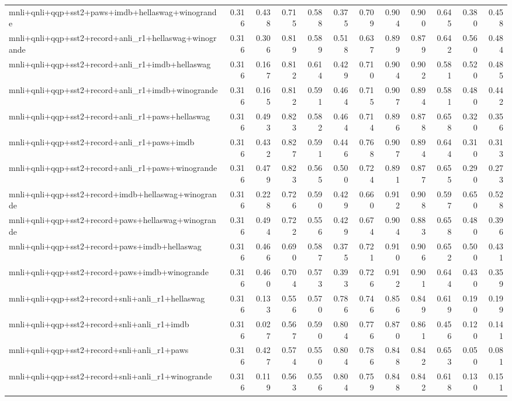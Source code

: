 \begin{table}[t]
\begin{tabular}{lrrrrrrrrrrr}
    mnli+qnli+qqp+sst2+paws+imdb+hellaswag+winogrande & 0.316 & 0.438 & 0.715 & 0.588 & 0.375 & 0.709 & 0.904 & 0.900 & 0.645 & 0.380 & 0.458 \\
    mnli+qnli+qqp+sst2+record+anli\_r1+hellaswag+winogrande & 0.316 & 0.306 & 0.819 & 0.589 & 0.518 & 0.637 & 0.899 & 0.879 & 0.642 & 0.560 & 0.484 \\
    mnli+qnli+qqp+sst2+record+anli\_r1+imdb+hellaswag & 0.316 & 0.167 & 0.812 & 0.614 & 0.429 & 0.710 & 0.904 & 0.902 & 0.581 & 0.520 & 0.485 \\
    mnli+qnli+qqp+sst2+record+anli\_r1+imdb+winogrande & 0.316 & 0.165 & 0.812 & 0.591 & 0.464 & 0.715 & 0.907 & 0.894 & 0.581 & 0.480 & 0.442 \\
    mnli+qnli+qqp+sst2+record+anli\_r1+paws+hellaswag & 0.316 & 0.493 & 0.823 & 0.582 & 0.464 & 0.714 & 0.896 & 0.878 & 0.658 & 0.320 & 0.356 \\
    mnli+qnli+qqp+sst2+record+anli\_r1+paws+imdb & 0.316 & 0.432 & 0.827 & 0.591 & 0.446 & 0.768 & 0.907 & 0.894 & 0.644 & 0.310 & 0.313 \\
    mnli+qnli+qqp+sst2+record+anli\_r1+paws+winogrande & 0.316 & 0.479 & 0.823 & 0.565 & 0.500 & 0.724 & 0.891 & 0.877 & 0.655 & 0.290 & 0.273 \\
    mnli+qnli+qqp+sst2+record+imdb+hellaswag+winogrande & 0.316 & 0.228 & 0.726 & 0.590 & 0.429 & 0.660 & 0.912 & 0.908 & 0.597 & 0.650 & 0.528 \\
    mnli+qnli+qqp+sst2+record+paws+hellaswag+winogrande & 0.316 & 0.494 & 0.722 & 0.556 & 0.429 & 0.674 & 0.904 & 0.883 & 0.658 & 0.480 & 0.396 \\
    mnli+qnli+qqp+sst2+record+paws+imdb+hellaswag & 0.316 & 0.466 & 0.690 & 0.587 & 0.375 & 0.721 & 0.910 & 0.906 & 0.652 & 0.500 & 0.431 \\
    mnli+qnli+qqp+sst2+record+paws+imdb+winogrande & 0.316 & 0.460 & 0.704 & 0.573 & 0.393 & 0.726 & 0.912 & 0.901 & 0.644 & 0.430 & 0.359 \\
    mnli+qnli+qqp+sst2+record+snli+anli\_r1+hellaswag & 0.316 & 0.133 & 0.556 & 0.570 & 0.786 & 0.746 & 0.856 & 0.849 & 0.619 & 0.190 & 0.199 \\
    mnli+qnli+qqp+sst2+record+snli+anli\_r1+imdb & 0.316 & 0.027 & 0.567 & 0.590 & 0.804 & 0.776 & 0.870 & 0.861 & 0.456 & 0.120 & 0.141 \\
    mnli+qnli+qqp+sst2+record+snli+anli\_r1+paws & 0.316 & 0.427 & 0.574 & 0.550 & 0.804 & 0.786 & 0.848 & 0.842 & 0.653 & 0.050 & 0.081 \\
    mnli+qnli+qqp+sst2+record+snli+anli\_r1+winogrande & 0.316 & 0.119 & 0.563 & 0.556 & 0.804 & 0.759 & 0.848 & 0.842 & 0.618 & 0.130 & 0.151 \\

\end{tabular}
\end{table}
